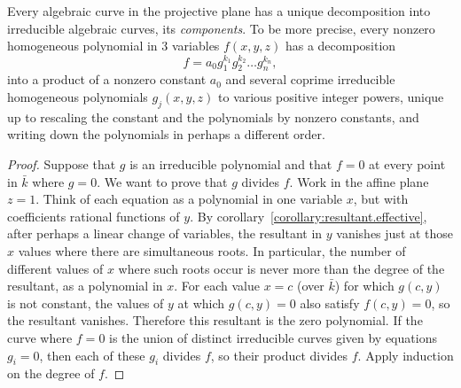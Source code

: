 \begin{theorem}[Study]\label{theorem:Study}
Every algebraic curve in the projective plane has a unique decomposition into irreducible algebraic curves, its \emph{components}.
To be more precise, every nonzero homogeneous polynomial in 3 variables \(f(x,y,z)\) has a decomposition
\[
f=a_0 g_1^{k_1} g_2^{k_2} \dots g_n^{k_n},
\]
into a product of a nonzero constant \(a_0\) and several coprime irreducible homogeneous polynomials \(g_j(x,y,z)\) to various positive integer powers, unique up to rescaling the constant and the polynomials by nonzero constants, and writing down the polynomials in perhaps a different order.
\end{theorem}
\begin{proof}
Suppose that \(g\) is an irreducible polynomial and that \(f=0\) at every point in \(\bar{k}\) where \(g=0\). 
We want to prove that \(g\) divides \(f\).
Work in the affine plane \(z=1\).
Think of each equation as a polynomial in one variable \(x\), but with coefficients rational functions of \(y\).
By corollary~\vref{corollary:resultant.effective}, after perhaps a linear change of variables, the resultant in \(y\) vanishes just at those \(x\) values where there are simultaneous roots.
In particular, the number of different values of \(x\) where such roots occur is never more than the degree of the resultant, as a polynomial in \(x\).
For each value \(x=c\) (over \(\bar{k}\)) for which \(g(c,y)\) is not constant, the values of \(y\) at which \(g(c,y)=0\) also satisfy \(f(c,y)=0\), so the resultant vanishes.
Therefore this resultant is the zero polynomial.
If the curve where \(f=0\) is the union of distinct irreducible curves given by equations \(g_i=0\), then each of these \(g_i\) divides \(f\), so their product divides \(f\).
Apply induction on the degree of \(f\).
\end{proof}

